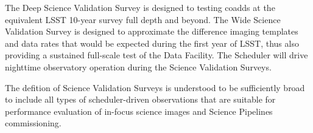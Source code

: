 
The Deep Science Validation Survey is designed to testing coadds at the equivalent LSST 10-year survey full depth and beyond.
The Wide Science Validation Survey is designed to approximate the difference imaging templates and data rates that would be expected during the first year of LSST, thus also providing a sustained full-scale test of the Data Facility.
The Scheduler will drive nighttime observatory operation during the Science Validation Surveys.

The defition of Science Validation Surveys is understood to be sufficiently broad to include all types of scheduler-driven observations that are suitable for performance evaluation of in-focus science images and Science Pipelines commissioning.





